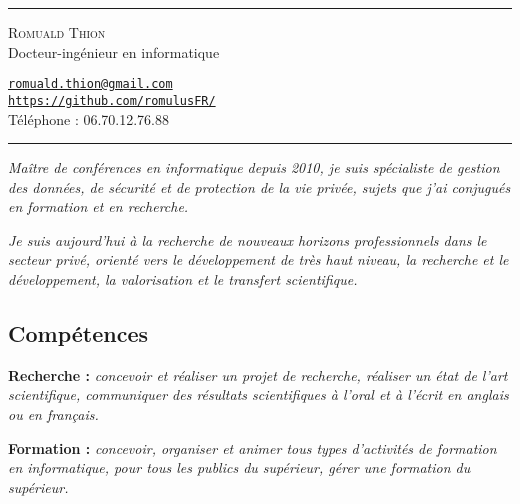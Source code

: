 \documentclass[12pt,a4paper]{article}
\newcommand{\hr}{\textcolor{gris80}{\rule{\linewidth}{0.5pt}}}
\newcommand{\activite}[1]{\textbf{#1}\xspace}
\newcommand{\comment}[1]{\textsl{#1}\xspace}
\begin{document}
\hr

\vspace{0.5em}

\begin{minipage}[c]{0.5\textwidth}
  \begin{center}
    {\LARGE\textsc{Romuald Thion}}\\
    Docteur-ingénieur en informatique\\
  \end{center}
\end{minipage}
\begin{minipage}[c]{0.5\textwidth}
  \begin{center}
    \href{mailto:romuald.thion@gmail.com}{\nolinkurl{romuald.thion@gmail.com}}\\
    \href{https://github.com/romulusFR/}{\nolinkurl{https://github.com/romulusFR/}}\\
    Téléphone : 06.70.12.76.88\\
  \end{center}
\end{minipage}

\vspace{0.5em}

\hr

\begin{center}
  \emph{Maître de conférences en informatique depuis 2010, je suis spécialiste de gestion des données, de sécurité et de protection de la vie privée, sujets que j'ai conjugués en formation et en recherche.}

  \emph{Je suis aujourd'hui à la recherche de nouveaux horizons professionnels dans le secteur privé, orienté vers le développement de très haut niveau, la recherche et le développement, la valorisation et le transfert scientifique.}
\end{center}

\subsection*{Compétences}

  \activite{Recherche :}
  \comment{concevoir et réaliser un projet de recherche, réaliser un état de l'art scientifique, communiquer des résultats scientifiques à l'oral et à l'écrit en anglais ou en français.}

  \activite{Formation :}
  \comment{concevoir, organiser et animer tous types d'activités de formation en informatique, pour tous les publics du supérieur, gérer une formation du supérieur.}
\end{document}
